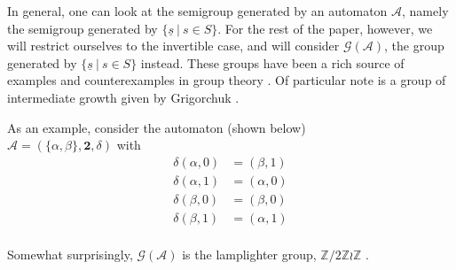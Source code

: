 \documentclass[12pt]{article}
\newcommand{\A}{\mathcal{A}}
\newcommand{\G}{\mathcal{G}}
\newcommand{\Z}{\mathbb{Z}}
\newcommand{\2}{\textbf{2}}
\begin{document}
In general, one can look at the semigroup generated by an automaton $\A$,
namely the semigroup generated by $\{ \underline{s}~|~s \in S \}$.
For the rest of the paper, however, we will restrict ourselves to the
invertible case, and will consider $\G(\A)$, the group generated by 
$\{ \underline{s}~|~s \in S \}$ instead. These groups have been a rich
source of examples and counterexamples in group theory 
\cite{Nekrashevych05:self_similar_groups%
     ,Sidki00:one_rooted_trees%
     ,GrigorchukNS00:automata_groups%
     }. 
Of particular note is a group of intermediate growth given by Grigorchuk 
\cite{GrigorchukNS00:automata_groups}.


As an example, consider the automaton (shown below)\\
$\A = (\{ \alpha, \beta \}, \2, \delta)$
with 
\begin{align*}
  \delta(\alpha,0)   &= (\beta,1)\\
  \delta(\alpha,1)   &= (\alpha,0)\\
  \delta(\beta,0) &= (\beta,0)\\
  \delta(\beta,1) &= (\alpha,1)\\
\end{align*}

\begin{center}
\end{center}

Somewhat surprisingly, $\G(\A)$ is the lamplighter group, $\Z/2\Z \wr \Z$
\cite{GrigorchukZuk01:lamplighter}.
\end{document}
